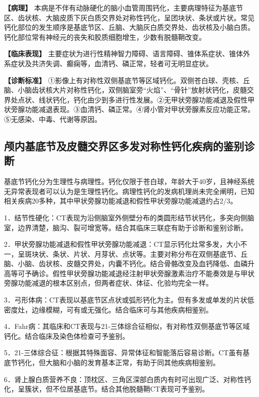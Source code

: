 \textbf{【病理】}
本病是不伴有动脉硬化的脑小血管周围钙化，主要病理特征为基底节区、齿状核、大脑皮质下灰白质交界处对称性钙化，呈团块状、条状或片状。常见钙化部位的发生顺序是基底节区、丘脑、大脑灰白质交界处、齿状核及小脑白质。钙化部位常有神经元的丧失和胶质细胞增生，少数有脱髓鞘改变。

\textbf{【临床表现】}
主要症状为进行性精神智力障碍、语言障碍、锥体系症状、锥体外系症状及共济失调、癫痫等，血清钙、磷正常，轻者可无明显症状。

\textbf{【诊断标准】}
①影像上有对称性双侧基底节等区域钙化。双侧苍白球、壳核、丘脑、小脑齿状核大片对称性钙化，双侧脑室旁“火焰”、“骨针”放射状钙化，皮髓交界处点状、线状钙化，钙化由少到多进行性发展。②无甲状旁腺功能减退及假性甲状旁腺功能减退表现。③血清钙、磷正常。④肾小管对甲状旁腺素反应功能正常。⑤无感染、中毒、代谢等原因。

\subsection{颅内基底节及皮髓交界区多发对称性钙化疾病的鉴别诊断}

基底节钙化分为生理性与病理性。钙化仅限于苍白球，年龄大于40岁，且神经系统无异常表现者可以认为是生理性钙化。病理性钙化的发病机理尚未完全阐明，已知相关疾病20多种，其中甲状旁腺功能减退和假性甲状旁腺功能减退约占2/3。

1．结节性硬化：CT表现为沿侧脑室外侧壁分布的类圆形结节状钙化，多突向侧脑室，边界清楚，脑沟、裂可增宽等。结合其临床三联症有助于诊断和鉴别诊断。

2．甲状旁腺功能减退和假性甲状旁腺功能减退：CT显示钙化灶常多发，大小不一，呈斑块状、条状、片状、月芽状、点状等。主要对称分布在双侧基底节、丘脑、小脑、齿状核、皮髓交界处，内囊不钙化。结合骨骼改变及血钙降低、血磷升高等可予确诊。假性甲状旁腺功能减退经注射甲状旁腺激素治疗不能奏效是与甲状旁腺功能减退的根本区别点，但两者症状、体征、化验均完全一样。

3．弓形体病：CT表现以基底节区点状或弧形钙化为主。但有多发或单发的片状低密度灶，边缘模糊，可有或无强化。结合临床可与其他疾病相鉴别。

4．Fahr病：其临床和CT表现与21-三体综合征相似，有对称性双侧基底节等区域钙化。结合临床及染色体检查可予鉴别。

5．21-三体综合征：根据其特殊面容、异常体征和智能落后容易诊断。CT虽有基底节钙化，但大脑和小脑的发育基本正常，有助于同其他疾病相鉴别。

6．肾上腺白质营养不良：顶枕区、三角区深部白质内有时可出现广泛、对称性钙化，呈簇状，但不位居基底节。结合其他脱髓鞘CT表现可予鉴别。

